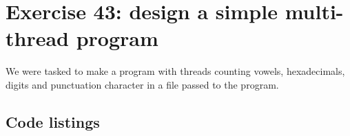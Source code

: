\documentclass[11pt]{article}
\begin{document}
\section*{Exercise 43: design a simple multi-thread program}
We were tasked to make a program with threads counting vowels, hexadecimals, digits and punctuation character in a file passed to the program.

\subsection*{Code listings}








\end{document}
